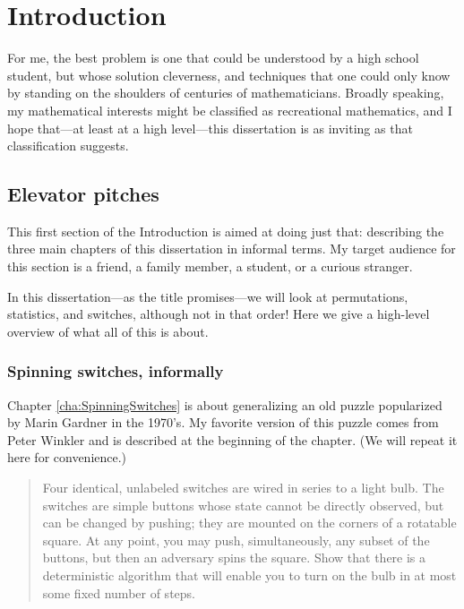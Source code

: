 \chapter{Introduction}
\label{cha:introduction}

For me, the best problem is one that could be understood by a high school
student, but whose solution cleverness, and techniques that one could only
know by standing on the shoulders of centuries of mathematicians. Broadly
speaking, my mathematical interests might be classified as recreational
mathematics, and I hope that---at least at a high level---this dissertation
is as inviting as that classification suggests.

\section{Elevator pitches}

This first section of the Introduction is aimed at doing just that:
describing the three main chapters of this dissertation in informal terms.
My target audience for this section is a friend, a family member,
a student, or a curious stranger.

In this dissertation---as the title promises---we will look at
permutations, sta\-tis\-tics, and switch\-es, although not in that order! Here we
give a high-level overview of what all of this is about.

\subsection{Spinning switches, informally}

Chapter \ref{cha:SpinningSwitches} is about generalizing an old puzzle
popularized by Marin Gardner in the 1970's. My favorite version of this
puzzle comes from Peter Winkler and is described at the beginning of the
chapter. (We will repeat it here for convenience.)

\begin{quote}
  Four identical, unlabeled switches are wired in series to a light bulb.
  The switches are simple buttons whose state cannot be directly observed,
  but can be changed by pushing; they are mounted on the corners of a
  rotatable square. At any point, you may push, simultaneously, any subset
  of the buttons, but then an adversary spins the square. Show that there
  is a deterministic algorithm that will enable you to turn on the bulb in
  at most some fixed number of steps. \cite{Winkler2004}
\end{quote}

